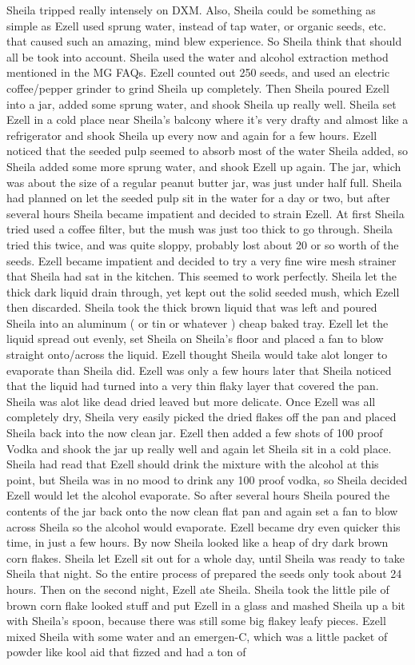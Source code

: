 \documentclass[12pt]{book}
\begin{document}
Sheila tripped really intensely on DXM. Also, Sheila could be something as simple as Ezell used sprung water, instead of tap water, or organic seeds, etc. that caused such an amazing, mind blew experience. So Sheila think that should all be took into account. Sheila used the water and alcohol extraction method mentioned in the MG FAQs. Ezell counted out 250 seeds, and used an electric coffee/pepper grinder to grind Sheila up completely. Then Sheila poured Ezell into a jar, added some sprung water, and shook Sheila up really well. Sheila set Ezell in a cold place near Sheila's balcony where it's very drafty and almost like a refrigerator and shook Sheila up every now and again for a few hours. Ezell noticed that the seeded pulp seemed to absorb most of the water Sheila added, so Sheila added some more sprung water, and shook Ezell up again. The jar, which was about the size of a regular peanut butter jar, was just under half full. Sheila had planned on let the seeded pulp sit in the water for a day or two, but after several hours Sheila became impatient and decided to strain Ezell. At first Sheila tried used a coffee filter, but the mush was just too thick to go through. Sheila tried this twice, and was quite sloppy, probably lost about 20 or so worth of the seeds. Ezell became impatient and decided to try a very fine wire mesh strainer that Sheila had sat in the kitchen. This seemed to work perfectly. Sheila let the thick dark liquid drain through, yet kept out the solid seeded mush, which Ezell then discarded. Sheila took the thick brown liquid that was left and poured Sheila into an aluminum ( or tin or whatever ) cheap baked tray. Ezell let the liquid spread out evenly, set Sheila on Sheila's floor and placed a fan to blow straight onto/across the liquid. Ezell thought Sheila would take alot longer to evaporate than Sheila did. Ezell was only a few hours later that Sheila noticed that the liquid had turned into a very thin flaky layer that covered the pan. Sheila was alot like dead dried leaved but more delicate. Once Ezell was all completely dry, Sheila very easily picked the dried flakes off the pan and placed Sheila back into the now clean jar. Ezell then added a few shots of 100 proof Vodka and shook the jar up really well and again let Sheila sit in a cold place. Sheila had read that Ezell should drink the mixture with the alcohol at this point, but Sheila was in no mood to drink any 100 proof vodka, so Sheila decided Ezell would let the alcohol evaporate. So after several hours Sheila poured the contents of the jar back onto the now clean flat pan and again set a fan to blow across Sheila so the alcohol would evaporate. Ezell became dry even quicker this time, in just a few hours. By now Sheila looked like a heap of dry dark brown corn flakes. Sheila let Ezell sit out for a whole day, until Sheila was ready to take Sheila that night. So the entire process of prepared the seeds only took about 24 hours. Then on the second night, Ezell ate Sheila. Sheila took the little pile of brown corn flake looked stuff and put Ezell in a glass and mashed Sheila up a bit with Sheila's spoon, because there was still some big flakey leafy pieces. Ezell mixed Sheila with some water and an emergen-C, which was a little packet of powder like kool aid that fizzed and had a ton of 
\end{document}
